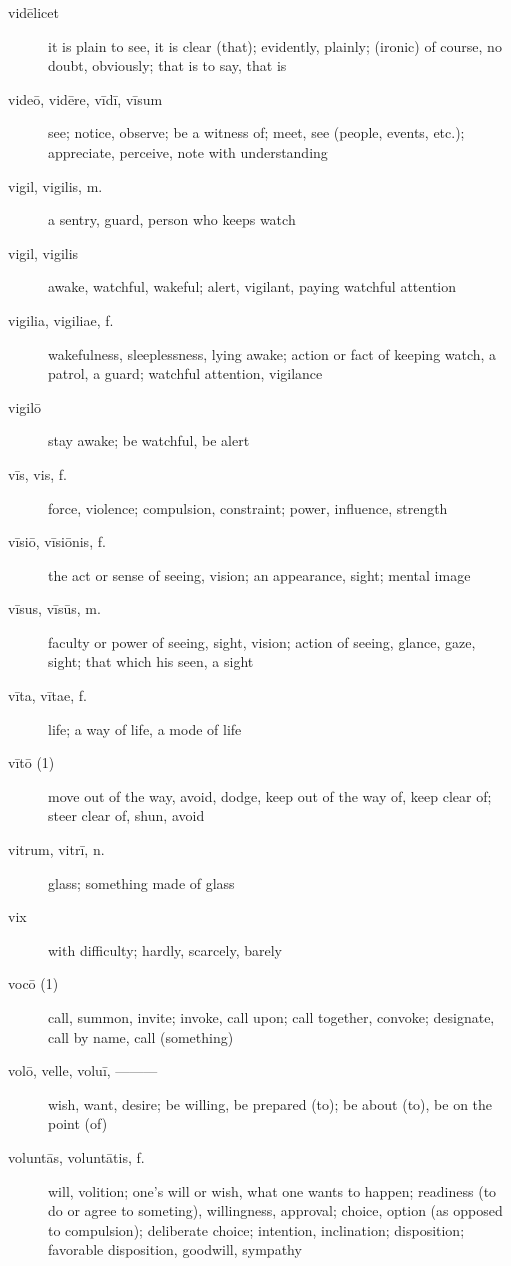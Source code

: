 \begin{description}
    \item[vidēlicet] it is plain to see, it is clear (that); evidently, plainly; (ironic) of course, no doubt, obviously; that is to say, that is
    \item[videō, vidēre, vīdī, vīsum] \marginnote{*}see; notice, observe; be a witness of; meet, see (people, events, etc.); appreciate, perceive, note with understanding
    \item[vigil, vigilis, m.] a sentry, guard, person who keeps watch
    \item[vigil, vigilis] awake, watchful, wakeful; alert, vigilant, paying watchful attention
    \item[vigilia, vigiliae, f.] wakefulness, sleeplessness, lying awake; action or fact of keeping watch, a patrol, a guard; watchful attention, vigilance
    \item[vigilō] stay awake; be watchful, be alert
    \item[vīs, vis, f.] \marginnote{*}force, violence; compulsion, constraint; power, influence, strength
    \item[vīsiō, vīsiōnis, f.] the act or sense of seeing, vision; an appearance, sight; mental image
    \item[vīsus, vīsūs, m.] faculty or power of seeing, sight, vision; action of seeing, glance, gaze, sight; that which his seen, a sight
    \item[vīta, vītae, f.] \marginnote{*}life; a way of life, a mode of life
    \item[vītō (1)] \marginnote{*}move out of the way, avoid, dodge, keep out of the way of, keep clear of; steer clear of, shun, avoid
    \item[vitrum, vitrī, n.] glass; something made of glass
    \item[vix] \marginnote{*}with difficulty; hardly, scarcely, barely
    \item[vocō (1)] \marginnote{*}call, summon, invite; invoke, call upon; call together, convoke; designate, call by name, call (something)
    \item[volō, velle, voluī, ———] \marginnote{*}wish, want, desire; be willing, be prepared (to); be about (to), be on the point (of)
    \item[voluntās, voluntātis, f.] \marginnote{*}will, volition; one's will or wish, what one wants to happen; readiness (to do or agree to someting), willingness, approval; choice, option (as opposed to compulsion); deliberate choice; intention, inclination; disposition; favorable disposition, goodwill, sympathy

\end{description}
